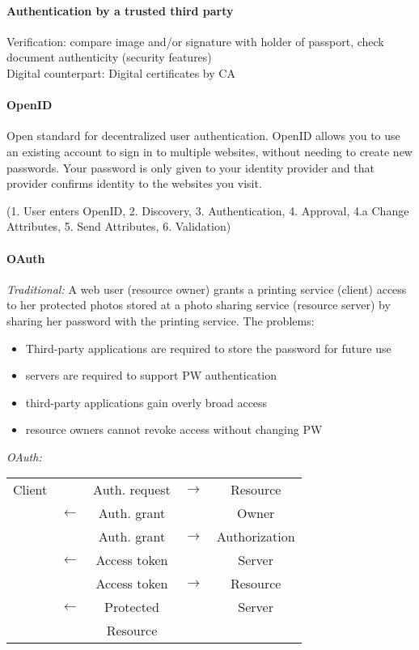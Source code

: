 \paragraph{Authentication by a trusted third party}
Verification: compare image and/or signature with holder of passport, check document authenticity (security features) \\
Digital counterpart: Digital certificates by CA

\paragraph{OpenID}
Open standard for decentralized user authentication. OpenID allows
you to use an existing account to sign in to multiple websites,
without needing to create new passwords. Your password is only
given to your identity provider and that provider confirms identity to
the websites you visit.

(1. User enters OpenID, 2. Discovery, 3.
Authentication, 4. Approval, 4.a Change Attributes, 5. Send
Attributes, 6. Validation)

\paragraph{OAuth}
\emph{Traditional:} A web user (resource owner) grants a printing service
(client) access to her protected photos stored at a photo sharing
service (resource server) by sharing her password with the printing
service. The problems:
\begin{itemize}
 \item Third-party applications are required to store the password for
future use
 \item servers are required to support PW authentication
 \item third-party applications gain overly broad access
  \item resource owners cannot revoke access without changing PW
\end{itemize}

\emph{OAuth:}

\begin{tabular}{c|ccc|c}
  Client  &  & Auth. request & $\rightarrow$ & Resource \\ 
  & $\leftarrow$ & Auth. grant &  & Owner \\ 
 &  & Auth. grant & $\rightarrow$ & Authorization \\ 
   & $\leftarrow$ & Access token &  & Server \\ 
  &  & Access token & $\rightarrow$ & Resource \\ 
 & $\leftarrow$ & Protected &  & Server \\ 
 &  & Resource &  &  \\ 
\end{tabular} 


